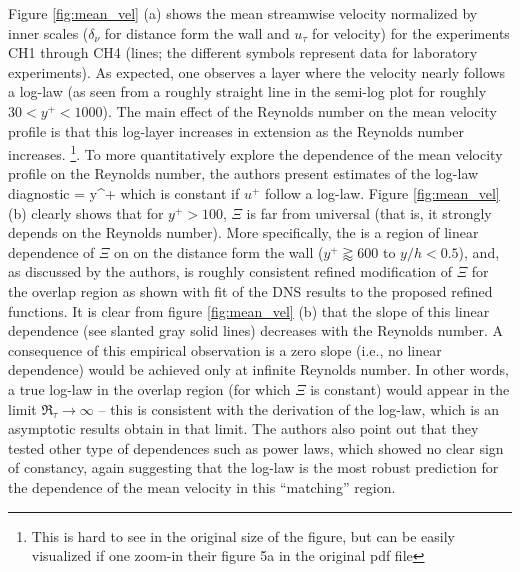\documentclass[11pt]{article}
\begin{document}
\begin{enumerate}[label=(\alph*)]
        Figure \ref{fig:mean_vel} (a) shows the mean streamwise velocity normalized by inner
        scales ($\delta_\nu$ for distance form the wall and $u_\tau$ for velocity) for the experiments
        CH1 through CH4 (lines; the different symbols represent data for laboratory experiments).
        As expected, one observes a layer where the velocity nearly follows a log-law (as seen
        from a roughly straight line in the semi-log plot for roughly $30 <y^+<1000$). The main
        effect of the Reynolds number on the mean velocity profile is that this log-layer increases
        in extension as the Reynolds number increases. \footnote{This is hard to see in the original
         size of the figure, but can be easily visualized if one zoom-in their figure 5a in the 
        original pdf file}. To more quantitatively explore the dependence of the mean velocity profile
        on the  Reynolds number, the authors present estimates of the log-law diagnostic
        \beq
            \Xi = y^+ \com
        \eeq
        which is constant if $u^+$ follow a log-law. Figure \ref{fig:mean_vel} (b) clearly shows
        that for $y^+>100$, $\Xi$ is far from universal (that is, it strongly depends on the
        Reynolds number). More specifically, the is a region of linear dependence of $\Xi$ on
        on the distance form the wall ($y^+ \gtrapprox 600$ to $y/h < 0.5$), and, as discussed by
        the authors, is roughly consistent refined modification of $\Xi$ for the overlap region
        as shown with fit of the DNS results to the proposed refined functions. It is clear from
        figure \ref{fig:mean_vel} (b) that the slope of this linear dependence (see slanted gray 
        solid lines) decreases with the Reynolds number. A consequence of this empirical observation
        is a zero slope (i.e., no linear dependence) would be achieved only at infinite  Reynolds number.
        In other words, a true log-law in the overlap region (for which $\Xi$ is constant) would appear
        in the limit $\Re_\tau \to \infty$ – this is consistent with the derivation of the log-law,
        which is an asymptotic results obtain in that limit. The authors also point out that they
        tested other type of dependences such as power laws, which showed no clear sign of constancy,
        again suggesting that the log-law is the most robust prediction for the dependence of the
        mean velocity in this ``matching'' region.


\end{enumerate}
\end{document}

